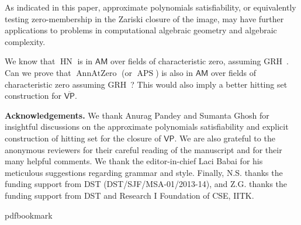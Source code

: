 \documentclass[11pt]{article}
\numberwithin{equation}{section}
\theoremstyle{definition}
\theoremstyle{plain}
\newcommand{\cclass}[1]{\textsf{#1}}
\newcommand{\AM}{\cclass{AM}\xspace}  %
\newcommand{\VP}{\cclass{VP}\xspace}  %
\newcommand{\VPbar}{\overline{\VP}\xspace}  %
\DeclareMathOperator{\APS}{\mathrm{APS}\xspace} %
\DeclareMathOperator{\AnnAtZero}{\mathrm{AnnAtZero}\xspace} %
\DeclareMathOperator{\HN}{\mathrm{HN}\xspace} %
\begin{document}
\smallskip
 As indicated in this paper, approximate polynomials satisfiability, or equivalently testing zero-membership in the Zariski closure of the image, may have further applications to problems in computational algebraic geometry and algebraic complexity. 

 We know that
 $\HN$ %
 is in $\AM$ over fields of characteristic zero, assuming GRH~\cite{koiran1996hilbert}. Can we 
%
prove that $\AnnAtZero$ (or $\APS$) is also in $\AM$ over %
 fields of characteristic zero assuming GRH~\cite{Kay09}? This would also imply a better hitting set construction for %
 $\VPbar$.


\bigskip\noindent
\textbf{Acknowledgements.}
We thank Anurag Pandey and Sumanta Ghosh for insightful discussions on the approximate polynomials satisfiability and explicit construction of hitting set for the closure of 
%
$\VP$. %
We are also grateful to the anonymous reviewers for their careful reading of the manuscript and for their many helpful comments. We thank the editor-in-chief Laci Babai for his meticulous suggestions regarding grammar and style.
Finally, N.S. thanks the funding support from DST (DST/SJF/MSA-01/2013-14), and Z.G. thanks the funding support from DST and Research I Foundation of CSE, IITK.

\nocite{lidl}

\providecommand{\bibhead}[1]{}
\expandafter\ifx\csname pdfbookmark\endcsname\relax%
  \providecommand{\tocrefpdfbookmark}{}
\else\providecommand{\tocrefpdfbookmark}{%
   \hypertarget{tocreferences}{}%
   \pdfbookmark[1]{References}{tocreferences}}%
\fi
\end{document}
